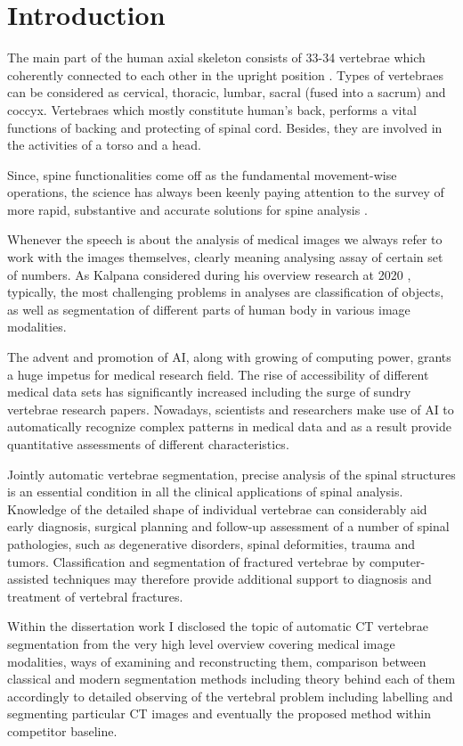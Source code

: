 \chapter{Introduction}
\label{ch:introduction}

The main part of the human axial skeleton consists of 33-34 vertebrae which coherently connected to each other in the upright position \cite{Ahlberg2005}. Types of vertebraes can be considered as cervical, thoracic, lumbar, sacral (fused into a sacrum) and coccyx. Vertebraes which mostly constitute human's back, performs a vital functions of backing and protecting of spinal cord. Besides, they are involved in the activities of a torso and a head.

Since, spine functionalities come off as the fundamental movement-wise operations, the science has always been keenly paying attention to the survey of more rapid, substantive and accurate solutions for spine analysis \cite{Litjens2017}.
 
Whenever the speech is about the analysis of medical images we always refer to work with the images themselves, clearly meaning analysing assay of certain set of numbers.
As Kalpana considered during his overview research at 2020 \cite{Kalpana2020},
typically, the most challenging problems in analyses are classification of objects, as well as segmentation of different parts of human body in various image modalities.  
 
The advent and promotion of AI, along with growing of computing power, \cite{Pham2000} grants a huge impetus for medical research field. The rise of accessibility of different medical data sets has significantly increased including the surge of sundry vertebrae research papers. Nowadays, scientists and researchers make use of AI to automatically recognize complex patterns in medical data and as a result provide quantitative assessments of different characteristics.  
 
Jointly automatic vertebrae segmentation, precise analysis of the spinal structures is an essential condition in all the clinical applications of spinal analysis. Knowledge of the detailed shape of individual vertebrae can considerably aid early diagnosis, surgical planning and follow-up assessment of a number of spinal pathologies, such as degenerative disorders, spinal deformities, trauma and tumors. Classification and segmentation of fractured vertebrae by computer-assisted techniques may therefore provide additional support to diagnosis and treatment of vertebral fractures. 

Within the dissertation work I disclosed the topic of automatic CT vertebrae segmentation from the very high level overview covering medical image modalities, ways of examining and reconstructing them, comparison between classical and modern segmentation methods including theory behind each of them accordingly to detailed observing of the vertebral problem including labelling and segmenting particular CT images and eventually the proposed method within competitor baseline.